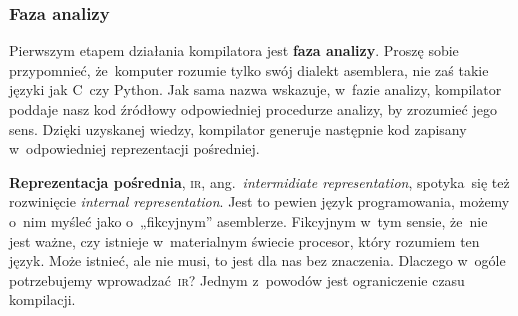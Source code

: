 \documentclass[10pt,t]{beamer}
\begin{document}
\begin{frame}
  \frametitle{Faza analizy}


  Pierwszym etapem działania kompilatora jest \textbf{faza analizy}. Proszę
  sobie przypomnieć, że~komputer rozumie tylko swój dialekt asemblera,
  nie zaś takie języki jak C~czy Python. Jak sama nazwa wskazuje, w~fazie
  analizy, kompilator poddaje nasz kod źródłowy odpowiedniej procedurze
  analizy, by zrozumieć jego sens. Dzięki uzyskanej wiedzy, kompilator
  generuje następnie kod zapisany w~odpowiedniej reprezentacji pośredniej.

  \textbf{Reprezentacja pośrednia}, \textsc{ir},
  ang.~\textit{intermidiate representation}, spotyka~się też
  rozwinięcie \textit{internal representation}. Jest to pewien język
  programowania, możemy o~nim myśleć jako o~„fikcyjnym” asemblerze.
  Fikcyjnym w~tym sensie, że~nie jest ważne, czy istnieje w~materialnym
  świecie procesor, który rozumiem ten język. Może istnieć, ale nie musi,
  to jest dla nas bez znaczenia. Dlaczego w~ogóle potrzebujemy
  wprowadzać~\textsc{ir}? Jednym z~powodów jest ograniczenie czasu
  kompilacji.

\end{frame}
\end{document}
